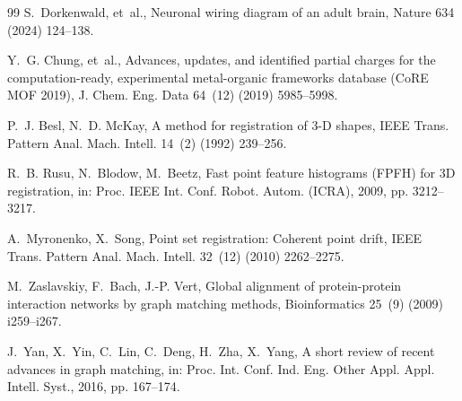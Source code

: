\documentclass[a4paper,fleqn]{cas-dc}
\theoremstyle{thmstyleone}
\theoremstyle{thmstyletwo}
\theoremstyle{thmstylethree}
\begin{document}
\begin{thebibliography}{99}
S.~Dorkenwald, et~al., Neuronal wiring diagram of an adult brain, Nature 634 (2024) 124--138.

Y.~G. Chung, et~al., Advances, updates, and identified partial charges for the computation-ready, experimental metal-organic frameworks database ({CoRE MOF} 2019), J. Chem. Eng. Data 64~(12) (2019) 5985--5998.

P.~J. Besl, N.~D. McKay, A method for registration of 3-{D} shapes, IEEE Trans. Pattern Anal. Mach. Intell. 14~(2) (1992) 239--256.

R.~B. Rusu, N.~Blodow, M.~Beetz, Fast point feature histograms ({FPFH}) for 3{D} registration, in: Proc. IEEE Int. Conf. Robot. Autom. (ICRA), 2009, pp. 3212--3217.

A.~Myronenko, X.~Song, Point set registration: Coherent point drift, IEEE Trans. Pattern Anal. Mach. Intell. 32~(12) (2010) 2262--2275.

M.~Zaslavskiy, F.~Bach, J.-P. Vert, Global alignment of protein-protein interaction networks by graph matching methods, Bioinformatics 25~(9) (2009) i259--i267.

J.~Yan, X.~Yin, C.~Lin, C.~Deng, H.~Zha, X.~Yang, A short review of recent advances in graph matching, in: Proc. Int. Conf. Ind. Eng. Other Appl. Appl. Intell. Syst., 2016, pp. 167--174.

\end{thebibliography}
\end{document}
